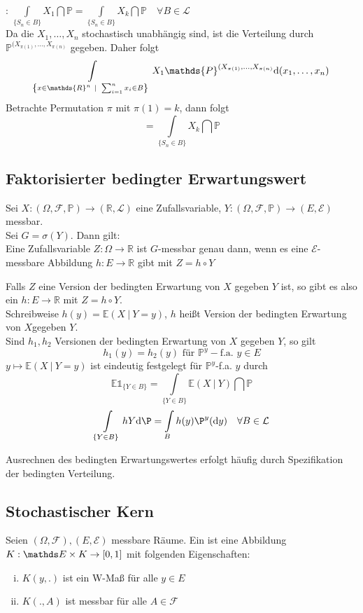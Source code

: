 \zz: $\int\limits_{\{S_n\in B\}}X_1\dint\mathds{P}= \int\limits_{\{S_n\in B\}}X_k\dint\mathds{P}\quad \forall B\in \mathcal{L}$\\

Da die $X_1,\dots,X_n$ stochastisch unabhängig sind, ist die Verteilung durch $\mathds{P}^{(X_{\pi(1)},\dots,X_{\pi(n)}}$ gegeben. Daher folgt \[ \int\limits_{\penbrace{x\in \mathds{R}^n~|~\sum_{i=1}^{n}x_i \in B}}X_1\mathds{P}^{(X_{\pi(1)},\dots,X_{\pi(n)}}\mathrm{d}(x_1,\dots,x_n)\]
Betrachte Permutation $\pi$ mit $\pi(1)=k$, dann folgt \[=\int\limits_{\{S_n\in B\}}X_k\dint\mathds{P} \]


\subsection{Faktorisierter bedingter Erwartungswert}
\label{sub:fakt_ew}
Sei $X:(\Omega,\mathcal{F},\mathds{P}) \to (\mathds{R},\mathcal{L})$ eine Zufallsvariable, $Y:(\Omega,\mathcal{F},\mathds{P}) \to (E,\mathcal{E})$ messbar.\\ Sei $G=\sigma(Y)$. Dann gilt:\\
Eine Zufallsvariable $Z:\Omega\to \mathds{R}$ ist $G$-messbar genau dann, wenn es eine $\mathcal{E}$-messbare Abbildung $h:E\to \mathds{R}$ gibt mit $Z=h\circ Y$



Falls $Z$ eine Version der bedingten Erwartung von $X$ gegeben $Y$ ist, so gibt es also ein $h:E\to \mathds{R}$ mit $Z=h\circ Y$.\\
Schreibweise $h(y)=\mathds{E}(X~|~Y=y)$, $h$ heißt Version der  bedingten Erwartung von $X$gegeben $Y$.\\
Sind $h_1,h_2$ Versionen der bedingten Erwartung von $X$ gegeben $Y$, so gilt \[h_1(y)=h_2(y) \text{ für }\mathds{P}^y-\text{f.a. }y\in E \]
$y\mapsto \mathds{E}(X~|~Y=y)$ ist eindeutig festgelegt für $\mathds{P}^y$-f.a. $y$ durch \[\mathds{E}\mathbb{1}_{\{Y\in B\}}=\int\limits_{\{Y\in B\}}\mathds{E}(X~|~Y)\dint \mathds{P} \]
\[\int\limits_{\{Y\in B\}}hY\dint\P = \int\limits_B h(y) \P^y(\dint y) \quad \forall B\in \mathcal{L} \]

Ausrechnen des bedingten Erwartungswertes erfolgt häufig durch Spezifikation der bedingten Verteilung.


\subsection{Stochastischer Kern}
\label{sub:stoch_kern}
Seien $(\Omega,\mathcal{F}),(E,\mathcal{E})$ messbare Räume. Ein  ist eine Abbildung $K:\E\times K \to [0,1]$ mit folgenden Eigenschaften:
\begin{enumerate}[(i)]
	\item $K(y,.)$ ist ein W-Maß für alle $y\in E$
	\item $K(.,A)$ ist messbar für alle $A\in \mathcal{F}$
\end{enumerate}

